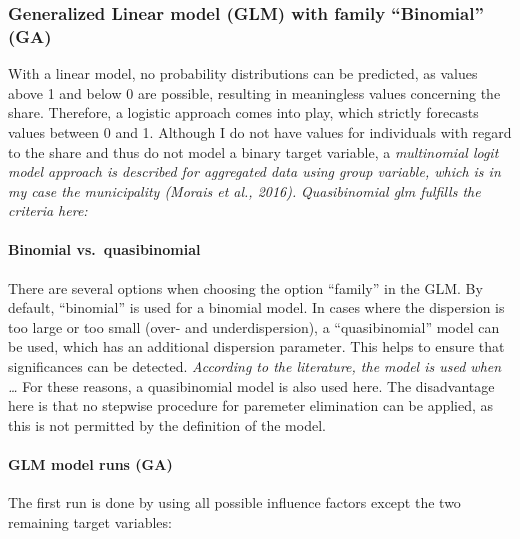 \documentclass[
]{article}
\begin{document}
\hypertarget{generalized-linear-model-glm-with-family-binomial-ga}{%
\subsubsection{Generalized Linear model (GLM) with family ``Binomial''
(GA)}\label{generalized-linear-model-glm-with-family-binomial-ga}}

With a linear model, no probability distributions can be predicted, as
values above 1 and below 0 are possible, resulting in meaningless values
concerning the share. Therefore, a logistic approach comes into play,
which strictly forecasts values between 0 and 1. Although I do not have
values for individuals with regard to the share and thus do not model a
binary target variable, a \emph{multinomial logit model approach is
described for aggregated data using group variable, which is in my case
the municipality (Morais et al., 2016).} \emph{Quasibinomial glm
fulfills the criteria here:}

\hypertarget{binomial-vs.-quasibinomial}{%
\paragraph{\texorpdfstring{Binomial
vs.~quasibinomial\newline}{Binomial vs.~quasibinomial}}\label{binomial-vs.-quasibinomial}}

There are several options when choosing the option ``family'' in the
GLM. By default, ``binomial'' is used for a binomial model. In cases
where the dispersion is too large or too small (over- and
underdispersion), a ``quasibinomial'' model can be used, which has an
additional dispersion parameter. This helps to ensure that significances
can be detected. \emph{According to the literature, the model is used
when \ldots{}} For these reasons, a quasibinomial model is also used
here. The disadvantage here is that no stepwise procedure for paremeter
elimination can be applied, as this is not permitted by the definition
of the model.

\hypertarget{glm-model-runs-ga}{%
\paragraph{\texorpdfstring{GLM model runs
(GA)\newline}{GLM model runs (GA)}}\label{glm-model-runs-ga}}

The first run is done by using all possible influence factors except the
two remaining target variables:
\end{document}
